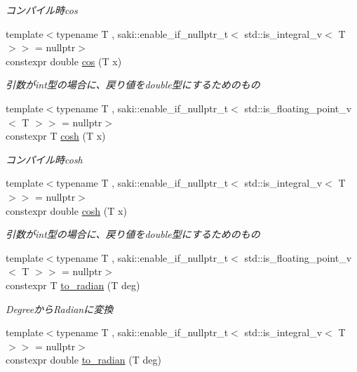 \begin{DoxyCompactItemize}
\begin{DoxyCompactList}\small\item\em コンパイル時cos \end{DoxyCompactList}\item 
{\footnotesize template$<$typename T , saki\+::enable\+\_\+if\+\_\+nullptr\+\_\+t$<$ std\+::is\+\_\+integral\+\_\+v$<$ T $>$$>$  = nullptr$>$ }\\constexpr double \mbox{\hyperlink{namespacesaki_ab1f49aa2d1182883ae8b4c01b346cc88}{cos}} (T x)
\begin{DoxyCompactList}\small\item\em 引数がint型の場合に、戻り値をdouble型にするためのもの \end{DoxyCompactList}\item 
{\footnotesize template$<$typename T , saki\+::enable\+\_\+if\+\_\+nullptr\+\_\+t$<$ std\+::is\+\_\+floating\+\_\+point\+\_\+v$<$ T $>$$>$  = nullptr$>$ }\\constexpr T \mbox{\hyperlink{namespacesaki_a0f8167af6da5c9eb510d33dadae13708}{cosh}} (T x)
\begin{DoxyCompactList}\small\item\em コンパイル時cosh \end{DoxyCompactList}\item 
{\footnotesize template$<$typename T , saki\+::enable\+\_\+if\+\_\+nullptr\+\_\+t$<$ std\+::is\+\_\+integral\+\_\+v$<$ T $>$$>$  = nullptr$>$ }\\constexpr double \mbox{\hyperlink{namespacesaki_afe248729248030bd5858469409e902d2}{cosh}} (T x)
\begin{DoxyCompactList}\small\item\em 引数がint型の場合に、戻り値をdouble型にするためのもの \end{DoxyCompactList}\item 
{\footnotesize template$<$typename T , saki\+::enable\+\_\+if\+\_\+nullptr\+\_\+t$<$ std\+::is\+\_\+floating\+\_\+point\+\_\+v$<$ T $>$$>$  = nullptr$>$ }\\constexpr T \mbox{\hyperlink{namespacesaki_a27595b1e53058ce792db7f8d29e2e9af}{to\+\_\+radian}} (T deg)
\begin{DoxyCompactList}\small\item\em Degreeから\+Radianに変換 \end{DoxyCompactList}\item 
{\footnotesize template$<$typename T , saki\+::enable\+\_\+if\+\_\+nullptr\+\_\+t$<$ std\+::is\+\_\+integral\+\_\+v$<$ T $>$$>$  = nullptr$>$ }\\constexpr double \mbox{\hyperlink{namespacesaki_aa671d122197cf10439eee0d271f51fe6}{to\+\_\+radian}} (T deg)

\end{DoxyCompactItemize}
